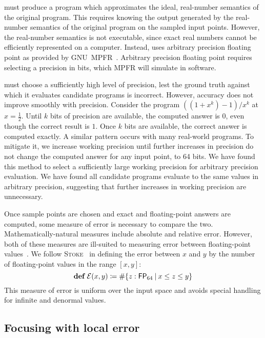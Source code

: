 \documentclass[paper.tex]{subfiles}
\begin{document}
\casio must produce a program which approximates
  the ideal, real-number semantics of the original program.
This requires knowing the output generated by
  the real-number semantics of the original program
  on the sampled input points.
However, the real-number semantics is not executable,
  since exact real numbers cannot be efficiently represented on a computer.
Instead, \casio uses arbitrary precision floating point
  as provided by GNU~MPFR~\cite{acm07-mpfr}.
Arbitrary precision floating point requires selecting a precision in bits,
  which MPFR will simulate in software.

\casio must choose a sufficiently high level of precision,
  lest the ground truth against which it evaluates candidate programs is incorrect.
However, accuracy does not improve smoothly with precision.
Consider the program $((1 + x^k) - 1) / x^k$ at $x = \frac12$.
Until $k$ bits of precision are available,
  the computed answer is $0$, even though the correct result is $1$.
Once $k$ bits are available, the correct answer is computed exactly.
A similar pattern occurs with many real-world programs.
To mitigate it, we increase working precision
  until further increases in precision do not change
  the computed answer for any input point, to 64 bits.
We have found this method to select a sufficiently large
  working precision for arbitrary precision evaluation.
We have found all candidate programs evaluate
  to the same values in arbitrary precision,
  suggesting that further increases in working precision are unnecessary.

Once sample points are chosen and exact and floating-point answers
  are computed, some measure of error is necessary to compare the two.
Mathematically-natural measures include absolute and relative error.
However, both of these measures are ill-suited to measuring error
  between floating-point values~\cite{pldi14-stoke}.
We follow \textsc{Stoke}~\cite{pldi14-stoke}
  in defining the error between $x$ and $y$ by
  the number of floating-point values in the range $[x, y]$:
\[
\!def!\:\Err(x, y) \ceq \#\{ z : \FP_{64}\:|\:x \le z \le y \}
\]
This measure of error is uniform over the input space
  and avoids special handling for infinite and denormal values.

\subsection{Focusing with local error}
\end{document}
